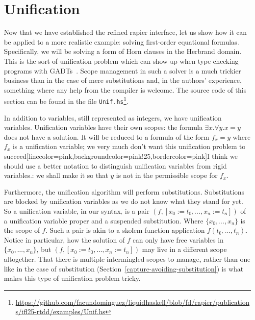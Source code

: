 \documentclass[sigconf, review]{acmart}
\newcommand{\improvement}[1]{\todo[linecolor=pink,backgroundcolor=pink!25,bordercolor=pink]{#1}}
\renewcommand{\todo}{}
\newcommand{\improvement}[1]{{}}
\newcommand{\tc}[1]{{\small\texttt{#1}}}
\newcommand{\sourcefile}[1]{\tc{#1}\footnote{\scriptsize\url{https://github.com/facundominguez/liquidhaskell/blob/fd/rapier/publications/ifl25-rtdd/examples/#1}}}
\begin{document}




\section{Unification}
\label{unification}

Now that we have established the refined rapier interface, let us show how it
can be applied to a more realistic example: solving first-order equational
formulas. Specifically, we will be solving a form of Horn clauses in
the Herbrand domain. This is the sort of unification problem which can show up
when type-checking programs with GADTs~\cite{schrijvers09}. Scope management in
such a solver is a much trickier business than in the case of mere substitutions
and, in the authors' experience, something where any help from the compiler is welcome.
The source code of this section can be found in the file
\sourcefile{Unif.hs}.

In addition to variables, still represented as integers, we have unification
variables. Unification variables have their own scopes: the formula
$\exists x. \forall y. x=y$ does not have a solution. It will be reduced to a
formula of the form $f_{x} = y$ where $f_{x}$ is a unification variable; we very much
don't want this unification problem to succeed\improvement{I think we should
  use a better notation to distinguish unification variables from rigid
  variables.}: we shall make it so that $y$ is not in the permissible scope for $f_{x}$.

Furthermore, the unification algorithm will perform substitutions. Substitutions are blocked by
unification variables as we do not know what they stand for yet. So a unification
variable, in our syntax, is a pair $(f, [x_0:=t_0,\ldots,x_n:=t_n])$ of a
unification variable proper and a suspended substitution. Where
$\{x_0,\ldots,x_{n}\}$ is the scope of $f$. Such a pair is akin to a skolem
function application $f(t_0,\ldots,t_n)$. Notice in particular, how the solution
of $f$ can only have free variables in $\{x_0,\ldots,x_{n}\}$, but
$(f, [x_0:=t_0,\ldots,x_n:=t_n])$ may live in a different scope altogether.
That there is multiple intermingled scopes to manage, rather than one like
in the case of substitution (Section~\ref{capture-avoiding-substitution})
is what makes this type of unification problem tricky.
\end{document}
